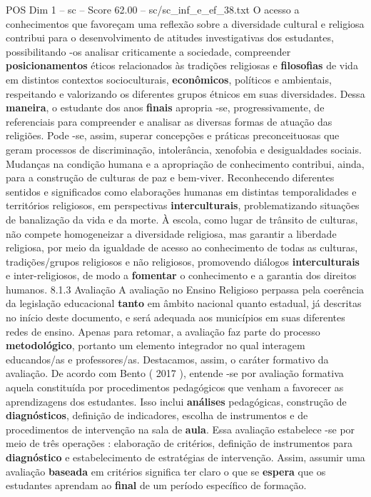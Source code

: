 \begin{textsample}{POS Dim 1 – sc – Score 62.00 – sc/sc\_inf\_e\_ef\_38.txt}
O acesso a conhecimentos que favoreçam uma reflexão sobre a diversidade cultural e religiosa contribui para o desenvolvimento de atitudes investigativas dos estudantes, possibilitando -os analisar criticamente a sociedade, compreender \textbf{posicionamentos} éticos relacionados às tradições religiosas e \textbf{filosofias} de vida em distintos contextos socioculturais, \textbf{econômicos}, políticos e ambientais, respeitando e valorizando os diferentes grupos étnicos em suas diversidades.
Dessa \textbf{maneira}, o estudante dos anos \textbf{finais} apropria -se, progressivamente, de referenciais para compreender e analisar as diversas formas de atuação das religiões.
Pode -se, assim, superar concepções e práticas preconceituosas que geram processos de discriminação, intolerância, xenofobia e desigualdades sociais.
Mudanças na condição humana e a apropriação de conhecimento contribui, ainda, para a construção de culturas de paz e bem-viver.
Reconhecendo diferentes sentidos e significados como elaborações humanas em distintas temporalidades e territórios religiosos, em perspectivas \textbf{interculturais}, problematizando situações de banalização da vida e da morte.
À escola, como lugar de trânsito de culturas, não compete homogeneizar a diversidade religiosa, mas garantir a liberdade religiosa, por meio da igualdade de acesso ao conhecimento de todas as culturas, tradições/grupos religiosos e não religiosos, promovendo diálogos \textbf{interculturais} e inter-religiosos, de modo a \textbf{fomentar} o conhecimento e a garantia dos direitos humanos. 8.1.3 Avaliação A avaliação no Ensino Religioso perpassa pela coerência da legislação educacional \textbf{tanto} em âmbito nacional quanto estadual, já descritas no início deste documento, e será adequada aos municípios em suas diferentes redes de ensino.
Apenas para retomar, a avaliação faz parte do processo \textbf{metodológico}, portanto um elemento integrador no qual interagem educandos/as e professores/as.
Destacamos, assim, o caráter formativo da avaliação.
De acordo com Bento ( 2017 ), entende -se por avaliação formativa aquela constituída por procedimentos pedagógicos que venham a favorecer as aprendizagens dos estudantes.
Isso inclui \textbf{análises} pedagógicas, construção de \textbf{diagnósticos}, definição de indicadores, escolha de instrumentos e de procedimentos de intervenção na sala de \textbf{aula}.
Essa avaliação estabelece -se por meio de três operações : elaboração de critérios, definição de instrumentos para \textbf{diagnóstico} e estabelecimento de estratégias de intervenção.
Assim, assumir uma avaliação \textbf{baseada} em critérios significa ter claro o que se \textbf{espera} que os estudantes aprendam ao \textbf{final} de um período específico de formação.

\end{textsample}
